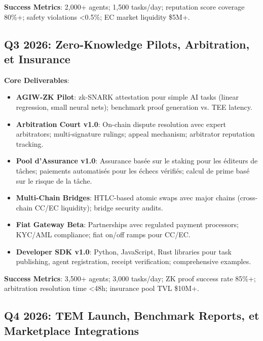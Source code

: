 \documentclass[11pt]{article}
\begin{document}
\textbf{Success Metrics}: 2,000+ agents; 1,500 tasks/day; reputation score coverage 80\%+; safety violations <0.5\%; EC market liquidity \$5M+.

\subsection{Q3 2026: Zero-Knowledge Pilots, Arbitration, et Insurance}

\textbf{Core Deliverables}:
\begin{itemize}[noitemsep]
  \item \textbf{AGIW-ZK Pilot}: zk-SNARK attestation pour simple AI tasks (linear regression, small neural nets); benchmark proof generation vs. TEE latency.
  \item \textbf{Arbitration Court v1.0}: On-chain dispute resolution avec expert arbitrators; multi-signature rulings; appeal mechanism; arbitrator reputation tracking.
  \item \textbf{Pool d'Assurance v1.0}: Assurance basée sur le staking pour les éditeurs de tâches; paiements automatisés pour les échecs vérifiés; calcul de prime basé sur le risque de la tâche.
  \item \textbf{Multi-Chain Bridges}: HTLC-based atomic swaps avec major chains (cross-chain CC/EC liquidity); bridge security audits.
  \item \textbf{Fiat Gateway Beta}: Partnerships avec regulated payment processors; KYC/AML compliance; fiat on/off ramps pour CC/EC.
  \item \textbf{Developer SDK v1.0}: Python, JavaScript, Rust libraries pour task publishing, agent registration, receipt verification; comprehensive examples.
\end{itemize}

\textbf{Success Metrics}: 3,500+ agents; 3,000 tasks/day; ZK proof success rate 85\%+; arbitration resolution time <48h; insurance pool TVL \$10M+.

\subsection{Q4 2026: TEM Launch, Benchmark Reports, et Marketplace Integrations}
\end{document}
